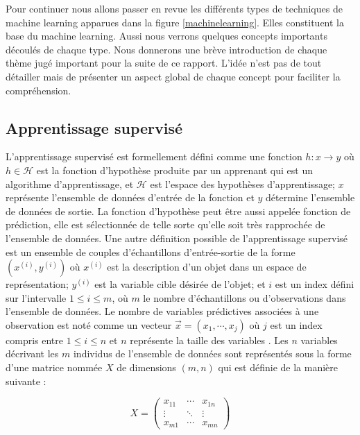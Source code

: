 \documentclass[12pt, french]{report}
\begin{document}
Pour continuer nous allons passer en revue les différents types de techniques de machine learning apparues dans la figure \ref{machinelearning}. Elles constituent la base du machine learning. Aussi nous verrons quelques concepts importants découlés de chaque type. Nous donnerons une brève introduction de chaque thème jugé important pour la suite de ce rapport. L'idée n'est pas de tout détailler mais de présenter un aspect global de chaque concept pour faciliter la compréhension.  

\subsection{Apprentissage supervisé}

L'apprentissage supervisé est formellement défini comme une fonction $h:x \rightarrow y $ où $h \in \mathcal{H} $ est la fonction d'hypothèse produite par un apprenant qui est un algorithme d'apprentissage, et $\mathcal{H}$ est l'espace des hypothèses d'apprentissage; $x$ représente l'ensemble de données d'entrée de la fonction et $y$ détermine l'ensemble de données de sortie. La fonction d'hypothèse peut être aussi appelée fonction de prédiction, elle est sélectionnée de telle sorte qu'elle soit très rapprochée de l'ensemble de données.  Une autre définition possible de l'apprentissage supervisé est un ensemble de couples d'échantillons d'entrée-sortie de la forme $(x^{(i)}, y^{(i)})$ où $x^{(i)}$ est la description d'un objet dans un espace de représentation; $y^{(i)}$ est la variable cible désirée de l'objet; et $i$ est un index  défini sur l'intervalle  $1 \leq i \leq m$, où $m$ le nombre d'échantillons ou d'observations dans l'ensemble de données. Le nombre de  variables prédictives associées à une observation est noté comme un vecteur $\vec{x}=(x_1, \cdots, x_j)$ où $j$ est un index compris entre $1 \leq i \leq n$ et $n$ représente la taille des variables \cite{key38, key40, key39}. Les $n$ variables décrivant les $m$ individus de l'ensemble de données sont représentés sous la forme d'une matrice nommée $X$ de dimensions $(m,n)$ qui est définie de la manière suivante :   

$$ 
	X=
		\begin{pmatrix}
			x_{11} & \cdots & x_{1n}\\
			\vdots & \ddots & \vdots \\
			x_{m1} & \cdots & x_{mn}
		\end{pmatrix}
$$      

\begin{flushright}
	\cite[p.~21]{key44}
\end{flushright}                                                               
\end{document}
